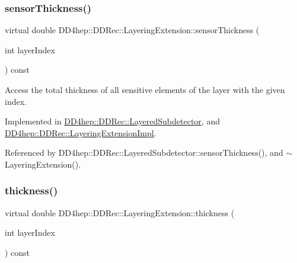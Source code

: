 \hypertarget{class_d_d4hep_1_1_d_d_rec_1_1_layering_extension_a06a960f9de84690eb3383f89d1aada13}{}\label{class_d_d4hep_1_1_d_d_rec_1_1_layering_extension_a06a960f9de84690eb3383f89d1aada13} 
\subsubsection{\texorpdfstring{sensor\+Thickness()}{sensorThickness()}}
{\footnotesize\ttfamily virtual double D\+D4hep\+::\+D\+D\+Rec\+::\+Layering\+Extension\+::sensor\+Thickness (\begin{DoxyParamCaption}\item[{int}]{layer\+Index }\end{DoxyParamCaption}) const\hspace{0.3cm}{\ttfamily [pure virtual]}}



Access the total thickness of all sensitive elements of the layer with the given index. 



Implemented in \hyperlink{class_d_d4hep_1_1_d_d_rec_1_1_layered_subdetector_a2bcb59309c2b579285e55daf4ccfbe3c}{D\+D4hep\+::\+D\+D\+Rec\+::\+Layered\+Subdetector}, and \hyperlink{class_d_d4hep_1_1_d_d_rec_1_1_layering_extension_impl_a1dc384fb9845f9440a044c9b8f08c8be}{D\+D4hep\+::\+D\+D\+Rec\+::\+Layering\+Extension\+Impl}.



Referenced by D\+D4hep\+::\+D\+D\+Rec\+::\+Layered\+Subdetector\+::sensor\+Thickness(), and $\sim$\+Layering\+Extension().

\hypertarget{class_d_d4hep_1_1_d_d_rec_1_1_layering_extension_a6510f43f195374e6adfb4312c27da450}{}\label{class_d_d4hep_1_1_d_d_rec_1_1_layering_extension_a6510f43f195374e6adfb4312c27da450} 
\subsubsection{\texorpdfstring{thickness()}{thickness()}}
{\footnotesize\ttfamily virtual double D\+D4hep\+::\+D\+D\+Rec\+::\+Layering\+Extension\+::thickness (\begin{DoxyParamCaption}\item[{int}]{layer\+Index }\end{DoxyParamCaption}) const\hspace{0.3cm}{\ttfamily [pure virtual]}}



